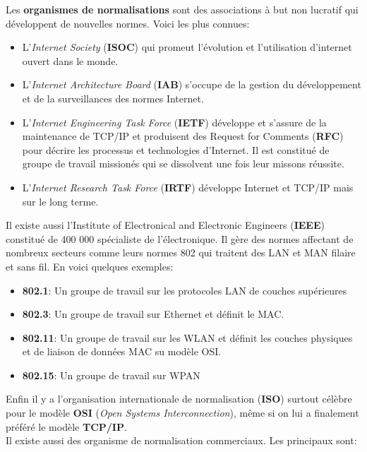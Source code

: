  Les \textbf{organismes de normalisations} sont des associations à but non lucratif qui développent de nouvelles normes. Voici les plus connues:
 \begin{itemize}
	 \item L'\textit{Internet Society} (\textbf{ISOC}) qui promeut l'évolution et l'utilisation d'internet ouvert dans le monde.
	 \item L'\textit{Internet Architecture Board} (\textbf{IAB}) s'occupe de la gestion du développement et de la surveillances des normes Internet.
	 \item L'\textit{Internet Engineering Task Force} (\textbf{IETF}) développe et s'assure de la maintenance de TCP/IP et produisent des Request for Comments (\textbf{RFC}) pour décrire les processus et technologies d'Internet. Il est constitué de groupe de travail missionés qui se dissolvent une fois leur missons réussite.
	 \item L'\textit{Internet Research Task Force} (\textbf{IRTF}) développe Internet et TCP/IP mais sur le long terme.
 \end{itemize}

 Il existe aussi l'Institute of Electronical and Electronic Engineers (\textbf{IEEE}) constitué de 400 000 spécialiste de l'électronique. Il gère des normes affectant de nombreux secteurs comme leurs normes 802 qui traitent des LAN et MAN filaire et sans fil. En voici quelques exemples:
 \begin{itemize}
	 \item \textbf{802.1}: Un groupe de travail sur les protocoles LAN de couches supérieures
	 \item \textbf{802.3}: Un groupe de travail sur Ethernet et définit le MAC\@.
	 \item \textbf{802.11}: Un groupe de travail sur les WLAN et définit les couches physiques et de liaison de données MAC su modèle OSI\@.
	 \item \textbf{802.15}: Un groupe de travail sur WPAN
 \end{itemize}

 Enfin il y a l'organisation internationale de normalisation (\textbf{ISO}) surtout célèbre pour le modèle \textbf{OSI} (\textit{Open Systems Interconnection}), même si on lui a finalement préféré le modèle \textbf{TCP/IP}.\\

 \indent
 Il existe aussi des organisme de normalisation commerciaux. Les principaux sont:


